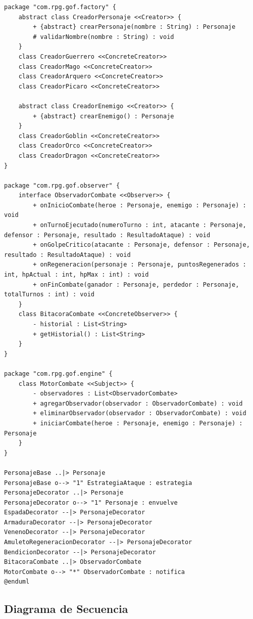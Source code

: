 \documentclass[12pt,letterpaper]{article}
\begin{document}
\begin{lstlisting}[caption={Código fuente PlantUML del Diagrama de Clases (\texttt{diagramas/diagrama\_clases.puml}).}]
package "com.rpg.gof.factory" {
    abstract class CreadorPersonaje <<Creator>> {
        + {abstract} crearPersonaje(nombre : String) : Personaje
        # validarNombre(nombre : String) : void
    }
    class CreadorGuerrero <<ConcreteCreator>>
    class CreadorMago <<ConcreteCreator>>
    class CreadorArquero <<ConcreteCreator>>
    class CreadorPicaro <<ConcreteCreator>>

    abstract class CreadorEnemigo <<Creator>> {
        + {abstract} crearEnemigo() : Personaje
    }
    class CreadorGoblin <<ConcreteCreator>>
    class CreadorOrco <<ConcreteCreator>>
    class CreadorDragon <<ConcreteCreator>>
}

package "com.rpg.gof.observer" {
    interface ObservadorCombate <<Observer>> {
        + onInicioCombate(heroe : Personaje, enemigo : Personaje) : void
        + onTurnoEjecutado(numeroTurno : int, atacante : Personaje, defensor : Personaje, resultado : ResultadoAtaque) : void
        + onGolpeCritico(atacante : Personaje, defensor : Personaje, resultado : ResultadoAtaque) : void
        + onRegeneracion(personaje : Personaje, puntosRegenerados : int, hpActual : int, hpMax : int) : void
        + onFinCombate(ganador : Personaje, perdedor : Personaje, totalTurnos : int) : void
    }
    class BitacoraCombate <<ConcreteObserver>> {
        - historial : List<String>
        + getHistorial() : List<String>
    }
}

package "com.rpg.gof.engine" {
    class MotorCombate <<Subject>> {
        - observadores : List<ObservadorCombate>
        + agregarObservador(observador : ObservadorCombate) : void
        + eliminarObservador(observador : ObservadorCombate) : void
        + iniciarCombate(heroe : Personaje, enemigo : Personaje) : Personaje
    }
}

PersonajeBase ..|> Personaje
PersonajeBase o--> "1" EstrategiaAtaque : estrategia
PersonajeDecorator ..|> Personaje
PersonajeDecorator o--> "1" Personaje : envuelve
EspadaDecorator --|> PersonajeDecorator
ArmaduraDecorator --|> PersonajeDecorator
VenenoDecorator --|> PersonajeDecorator
AmuletoRegeneracionDecorator --|> PersonajeDecorator
BendicionDecorator --|> PersonajeDecorator
BitacoraCombate ..|> ObservadorCombate
MotorCombate o--> "*" ObservadorCombate : notifica
@enduml
\end{lstlisting}

\subsection{Diagrama de Secuencia}
\end{document}
